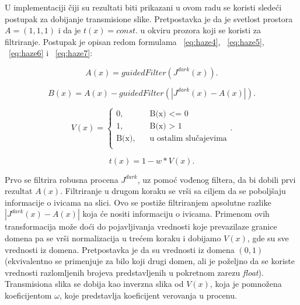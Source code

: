 \documentclass[a4paper,12pt,titlepage]{article}
\begin{document}
U implementaciji čiji su rezultati biti prikazani u ovom radu se koristi sledeći postupak za dobijanje transmisione slike. Pretpostavka je da je svetlost prostora $A = (1, 1, 1)$ i da je $t(x) = const.$ u okviru prozora koji se koristi za filtriranje. Postupak je opisan redom formulama ~\ref{eq:haze4}, ~\ref{eq:haze5}, ~\ref{eq:haze6} i ~\ref{eq:haze7}:

\begin{equation}\label{eq:haze4}
A(x) = guidedFilter(J^{dark}(x)).
\end{equation}

\begin{equation}\label{eq:haze5}
B(x) = A(x) - guidedFilter(|J^{dark}(x) - A(x)|).
\end{equation}

\begin{equation}\label{eq:haze6}
V(x) = 
\begin{cases}
\text{0,} &\quad\text{B(x) <= 0}\\
\text{1,} &\quad\text{B(x) > 1} \\
\text{B(x),} &\quad\text{u ostalim slučajevima}\\
\end{cases}
. \end{equation}

\begin{equation}\label{eq:haze7}
t(x) = 1 - w * V(x).
\end{equation}

Prvo se filtrira robusna procena $J^{dark}$, uz pomoć vođenog filtera, da bi dobili prvi rezultat $A(x)$. Filtriranje u drugom koraku se vrši sa ciljem da se poboljšaju informacije o ivicama na slici. Ovo se postiže filtriranjem apsolutne razlike $|J^{dark}(x) - A(x)|$ koja će nositi informaciju o ivicama. Primenom ovih transformacija može doći do pojavljivanja vrednosti koje prevazilaze granice domena pa se vrši normalizacija u trećem koraku i dobijamo $V(x)$, gde su sve vrednosti iz domena. Pretpostavka je da su vrednosti iz domena $(0, 1)$ (ekvivalentno se primenjuje za bilo koji drugi domen, ali je poželjno da se koriste vrednosti razlomljenih brojeva predstavljenih u pokretnom zarezu \emph{float}). Transmisiona slika se dobija kao inverzna slika od $V(x)$, koja je pomnožena koeficijentom $\omega$, koje predstavlja koeficijent verovanja u procenu.
\end{document}
